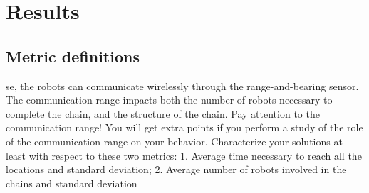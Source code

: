 \section{Results} \label{results}
\subsection{Metric definitions}\label{subsec:metric}
se, the robots can communicate wirelessly through
the range-and-bearing sensor. The communication range impacts both the number of robots necessary to complete the chain, and the structure of the chain.
Pay attention to the communication range! You will get extra points if you
perform a study of the role of the communication range on your behavior.
Characterize your solutions at least with respect to these two metrics:
1. Average time necessary to reach all the locations and standard deviation;
2. Average number of robots involved in the chains and standard deviation 




